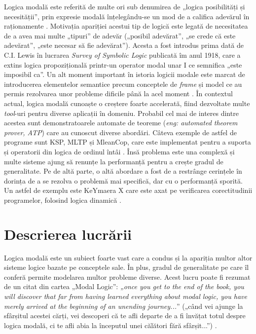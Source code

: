 \documentclass[12pt, openany]{book}
\newcommand{\myenglishterm}[1]{(\textit{eng: #1})}
\begin{document}
            \par{}
                Logica modală este referită de multe ori sub denumirea de „logica posibilități și necesității”, prin 
                expresie modală înțelegându-se un mod de a califica adevărul în raționamente 
                \cite{stanford_modal_logic}. Motivația apariției acestui tip de logică este legată de necesitatea de a 
                avea mai multe „tipuri” de adevăr („posibil adevărat”, „se crede că este adevărat”, „este necesar să fie
                adevărat”). Acesta a fost introdus prima dată de C.I. Lewis în lucrarea 
                \textit{Survey of Symbolic Logic} publicată îm anul 1918, care a extins logica propozițională printr-un 
                operator modal unar I ce semnifica „este imposibil ca”. Un alt moment important în istoria logicii 
                modale este marcat de introducerea elementelor semantice precum conceptele de \textit{frame} și model ce 
                au permis rezolvarea unor probleme dificile până la acel moment \cite{modal_logic}. În contextul actual, 
                logica modală cunoaște o creștere foarte accelerată, fiind dezvoltate multe \textit{tool}-uri pentru 
                diverse aplicații în domeniu. Probabil cel mai de interes dintre acestea sunt demonstratoarele automate 
                de teoreme \myenglishterm{automated theorem prover, ATP} care au cunoscut diverse abordări. Câteva 
                exemple de astfel de programe sunt KSP, MLTP și MleanCop, care este implementat pentru a suporta și 
                operatorii din logica de ordinul întâi \cite{ksp}\cite{mltp}\cite{MleanCop}. Însă problema este una 
                complexă și multe sisteme ajung să renunțe la performanță pentru a crește gradul de generalitate. Pe de 
                altă parte, o altă abordare a fost de a restrânge cerințele în dorința de a se rezolva o problemă mai 
                specifică, dar cu o performanță sporită. Un astfel de exemplu este KeYmaera X care este axat pe 
                verificarea corectitudinii programelor, folosind logica dinamică \cite{KeYmaera}.

        \section{Descrierea lucrării} %
        \label{section_description}
            \par{}
                Logica modală este un subiect foarte vast care a condus și la apariția multor altor sisteme logice 
                bazate pe conceptele sale. În plus, gradul de generalitate pe care îl conferă permite modelarea 
                multor probleme diverse. Acest lucru poate fi rezumat de un citat din cartea „Modal Logic”: \textit{„once 
                you get to the end of the book, you will discover that far from having learned everything about modal 
                logic, you have merely arrived at the beginning of an unending journey...}” („când vei ajunge la 
                sfârșitul acestei cărți, vei descoperi că te afli departe de a fi învățat totul despre logica modală, ci 
                te afli abia la începutul unei călători fără sfârșit...”) \cite{modal_logic}.
            
\end{document}

